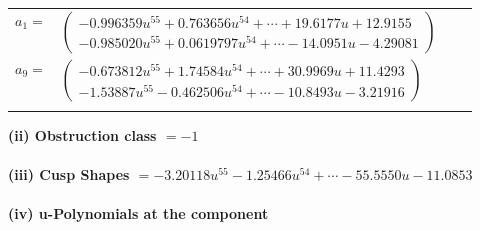 \documentclass[1p]{elsarticle_modified}
\theoremstyle{definition}
\begin{document}
\begin{tabular}{m{7pt} m{180pt} m{7pt} m{180pt} }
\flushright $a_{1}=$&$\begin{pmatrix}-0.996359 u^{55}+0.763656 u^{54}+\cdots+19.6177 u+12.9155\\-0.985020 u^{55}+0.0619797 u^{54}+\cdots-14.0951 u-4.29081\end{pmatrix}$ \\
\flushright $a_{9}=$&$\begin{pmatrix}-0.673812 u^{55}+1.74584 u^{54}+\cdots+30.9969 u+11.4293\\-1.53887 u^{55}-0.462506 u^{54}+\cdots-10.8493 u-3.21916\end{pmatrix}$\\&\end{tabular}
\flushleft \textbf{(ii) Obstruction class $= -1$}\\~\\
\flushleft \textbf{(iii) Cusp Shapes $= -3.20118 u^{55}-1.25466 u^{54}+\cdots-55.5550 u-11.0853$}\\~\\
\newpage\renewcommand{\arraystretch}{1}
\flushleft \textbf{(iv) u-Polynomials at the component}\newline \\
\end{document}
